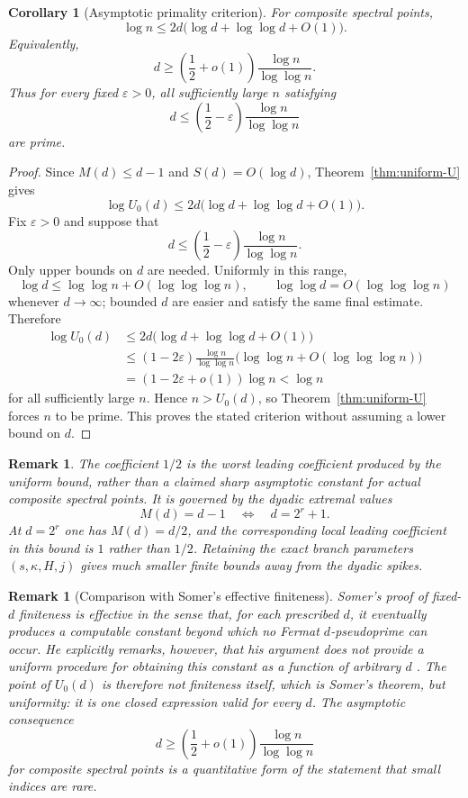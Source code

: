 \documentclass[11pt]{article}
\newtheorem{corollary}[theorem]{Corollary}
\newtheorem{remark}[theorem]{Remark}
\begin{document}
\begin{corollary}[Asymptotic primality criterion]
\label{cor:asymptotic-U}
For composite spectral points,
\[
\log n
\le
2d\bigl(\log d+\log\log d+O(1)\bigr).
\]
Equivalently,
\[
d\ge
\left(\frac12+o(1)\right)
\frac{\log n}{\log\log n}.
\]
Thus for every fixed $\varepsilon>0$, all sufficiently large $n$ satisfying
\[
d\le
\left(\frac12-\varepsilon\right)
\frac{\log n}{\log\log n}
\]
are prime.
\end{corollary}

\begin{proof}
Since $M(d)\le d-1$ and $S(d)=O(\log d)$, Theorem~\ref{thm:uniform-U}
gives
\[
\log U_0(d)
\le
2d\bigl(\log d+\log\log d+O(1)\bigr).
\]
Fix $\varepsilon>0$ and suppose that
\[
d\le\left(\frac12-\varepsilon\right)
\frac{\log n}{\log\log n}.
\]
Only upper bounds on $d$ are needed.  Uniformly in this range,
\[
\log d\le \log\log n+O(\log\log\log n),
\qquad
\log\log d=O(\log\log\log n)
\]
whenever $d\to\infty$; bounded $d$ are easier and satisfy the same final
estimate.  Therefore
\begin{align*}
\log U_0(d)
&\le 2d\bigl(\log d+\log\log d+O(1)\bigr)\\
&\le (1-2\varepsilon)
   \frac{\log n}{\log\log n}
   \bigl(\log\log n+O(\log\log\log n)\bigr)\\
&=(1-2\varepsilon+o(1))\log n<\log n
\end{align*}
for all sufficiently large $n$.  Hence $n>U_0(d)$, so
Theorem~\ref{thm:uniform-U} forces $n$ to be prime.  This proves the stated
criterion without assuming a lower bound on $d$.
\end{proof}

\begin{remark}
The coefficient $1/2$ is the worst leading coefficient produced by the
uniform bound, rather than a claimed sharp asymptotic constant for actual
composite spectral points.  It is governed by the dyadic extremal values
\[
M(d)=d-1
\quad\Longleftrightarrow\quad
d=2^r+1.
\]
At $d=2^r$ one has $M(d)=d/2$, and the corresponding local leading coefficient
in this bound is $1$ rather than $1/2$.  Retaining the exact branch parameters
$(s,\kappa,H,j)$ gives much smaller finite bounds away from the dyadic spikes.
\end{remark}

\begin{remark}[Comparison with Somer's effective finiteness]
Somer's proof of fixed-$d$ finiteness is effective in the sense that, for
each prescribed $d$, it eventually produces a computable constant beyond
which no Fermat $d$-pseudoprime can occur.  He explicitly remarks, however,
that his argument does not provide a uniform procedure for obtaining this
constant as a function of arbitrary $d$ \cite{Somer1989}.  The point of
$U_0(d)$ is therefore not finiteness itself, which is Somer's theorem, but
uniformity: it is one closed expression valid for every $d$.  The asymptotic
consequence
\[
d\ge\left(\frac12+o(1)\right)\frac{\log n}{\log\log n}
\]
for composite spectral points is a quantitative form of the statement that
small indices are rare.
\end{remark}
\end{document}
